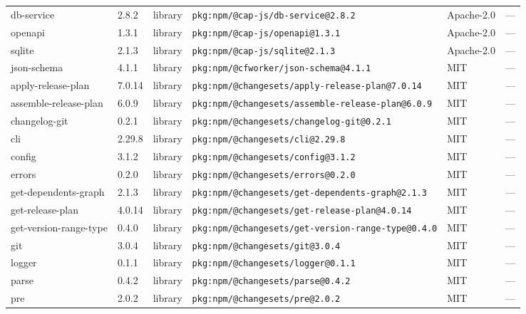 \documentclass[11pt,a4paper]{article}
\begin{document}
\begin{longtable}{|p{4cm}|p{2cm}|p{1.6cm}|p{5cm}|p{1.5cm}|p{3.5cm}|}
\raggedright db-service & 2.8.2 & library & \small\texttt{pkg:npm/@cap-js/db-service@2.8.2} & Apache-2.0 & \small — \\
\raggedright openapi & 1.3.1 & library & \small\texttt{pkg:npm/@cap-js/openapi@1.3.1} & Apache-2.0 & \small — \\
\raggedright sqlite & 2.1.3 & library & \small\texttt{pkg:npm/@cap-js/sqlite@2.1.3} & Apache-2.0 & \small — \\
\raggedright json-schema & 4.1.1 & library & \small\texttt{pkg:npm/@cfworker/json-schema@4.1.1} & MIT & \small — \\
\raggedright apply-release-plan & 7.0.14 & library & \small\texttt{pkg:npm/@changesets/apply-release-plan@7.0.14} & MIT & \small — \\
\raggedright assemble-release-plan & 6.0.9 & library & \small\texttt{pkg:npm/@changesets/assemble-release-plan@6.0.9} & MIT & \small — \\
\raggedright changelog-git & 0.2.1 & library & \small\texttt{pkg:npm/@changesets/changelog-git@0.2.1} & MIT & \small — \\
\raggedright cli & 2.29.8 & library & \small\texttt{pkg:npm/@changesets/cli@2.29.8} & MIT & \small — \\
\raggedright config & 3.1.2 & library & \small\texttt{pkg:npm/@changesets/config@3.1.2} & MIT & \small — \\
\raggedright errors & 0.2.0 & library & \small\texttt{pkg:npm/@changesets/errors@0.2.0} & MIT & \small — \\
\raggedright get-dependents-graph & 2.1.3 & library & \small\texttt{pkg:npm/@changesets/get-dependents-graph@2.1.3} & MIT & \small — \\
\raggedright get-release-plan & 4.0.14 & library & \small\texttt{pkg:npm/@changesets/get-release-plan@4.0.14} & MIT & \small — \\
\raggedright get-version-range-type & 0.4.0 & library & \small\texttt{pkg:npm/@changesets/get-version-range-type@0.4.0} & MIT & \small — \\
\raggedright git & 3.0.4 & library & \small\texttt{pkg:npm/@changesets/git@3.0.4} & MIT & \small — \\
\raggedright logger & 0.1.1 & library & \small\texttt{pkg:npm/@changesets/logger@0.1.1} & MIT & \small — \\
\raggedright parse & 0.4.2 & library & \small\texttt{pkg:npm/@changesets/parse@0.4.2} & MIT & \small — \\
\raggedright pre & 2.0.2 & library & \small\texttt{pkg:npm/@changesets/pre@2.0.2} & MIT & \small — \\

\end{longtable}
\end{document}
